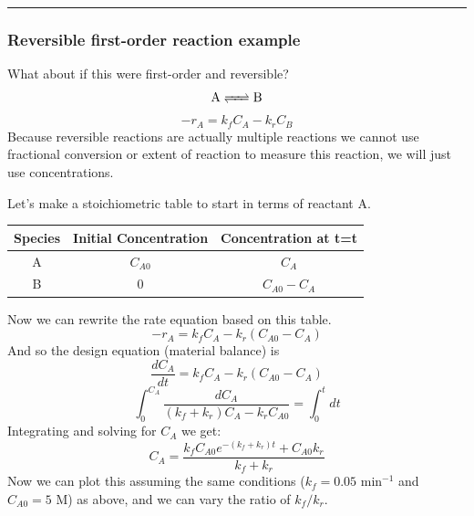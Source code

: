 \documentclass[
]{article}
\begin{document}
\begin{center}\rule{0.5\linewidth}{0.5pt}\end{center}

\hypertarget{reversible-first-order-reaction-example}{%
\subsubsection{Reversible first-order reaction example}\label{reversible-first-order-reaction-example}}

What about if this were first-order and reversible?
\[\ce{ A <=> B }\]
\[-r_A = k_fC_A - k_rC_B\]
Because reversible reactions are actually multiple reactions we cannot use fractional conversion or extent of reaction to measure this reaction, we will just use concentrations.

Let's make a stoichiometric table to start in terms of reactant A.

\begin{longtable}[]{@{}ccc@{}}
\toprule
Species & Initial Concentration & Concentration at t=t \\
\midrule
\endhead
A & \(C_{A0}\) & \(C_A\) \\
B & \(0\) & \(C_{A0}-C_A\) \\
\bottomrule
\end{longtable}

Now we can rewrite the rate equation based on this table.
\[-r_A = k_fC_A - k_r(C_{A0}-C_A)\]
And so the design equation (material balance) is
\[\frac{dC_A}{dt} = k_fC_A - k_r(C_{A0}-C_A)\]
\[\int_0^{C_A}\frac{dC_A}{(k_f + k_r)C_A - k_rC_{A0}} = \int_0^tdt \]
Integrating and solving for \(C_A\) we get:
\[C_A = \frac{k_fC_{A0}e^{-(k_f+k_r)t} + C_{A0}k_r}{k_f+k_r}\]
Now we can plot this assuming the same conditions (\(k_f = 0.05\text{ min}^{-1}\) and \(C_{A0} = 5\text{ M}\)) as above, and we can vary the ratio of \(k_f/k_r\).
\end{document}
